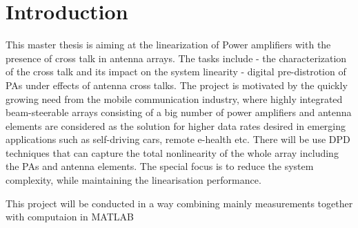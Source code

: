 \chapter{Introduction}\label{ch:introduction}

This master thesis is aiming at the linearization of Power amplifiers with the presence of cross talk in antenna arrays. The tasks include  - the characterization of the cross talk and its impact on the system linearity
- digital pre-distrotion of PAs under effects of antenna cross talks. The project is motivated by the quickly growing need from the mobile communication industry, where highly integrated beam-steerable arrays consisting of a big number of power amplifiers and antenna elements are considered as the solution for higher data rates desired in emerging applications such as self-driving cars, remote e-health etc. There will be use DPD techniques that can capture the total nonlinearity of the whole array including the PAs and antenna elements. The special focus is to reduce the system complexity, while maintaining the linearisation performance. 

This project will be conducted in a way combining mainly measurements together with computaion in MATLAB


